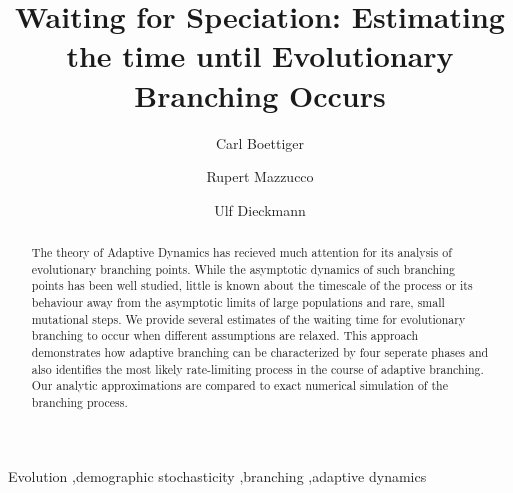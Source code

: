 \begin{frontmatter}
\title{Waiting for Speciation: Estimating the time until Evolutionary Branching Occurs}
\author[carl]{Carl Boettiger}
\author[rupert]{Rupert Mazzucco}
\author[ulf]{Ulf Dieckmann}
\address[carl]{Center for Population Biology, University of California, Davis, United States}
\address[rupert]{International Institute for Applied Systems Analysis, Austria}
\address[ulf]{International Institute for Applied Systems Analysis, Austria}
\begin{abstract}
The theory of Adaptive Dynamics has recieved much attention for its analysis of evolutionary branching points.  While the asymptotic dynamics of such branching points has been well studied, little is known about the timescale of the process or its behaviour away from the asymptotic limits of large populations and rare, small mutational steps.  We provide several estimates of the waiting time for evolutionary branching to occur when different assumptions are relaxed.  This approach demonstrates how adaptive branching can be characterized by four seperate phases and also identifies the most likely rate-limiting process in the course of adaptive branching.  Our analytic approximations are compared to exact numerical simulation of the branching process.  
\end{abstract}
\begin{keyword}
Evolution \sep demographic stochasticity \sep branching \sep adaptive dynamics
\end{keyword}
\end{frontmatter}

